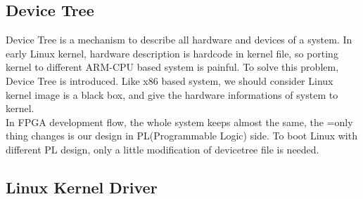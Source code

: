 \subsection{Device Tree}
\label{subsec:Device Tree}

Device Tree is a mechanism to describe all hardware and devices of a system. In early Linux 
kernel, hardware description is hardcode in kernel file, so porting kernel to different
ARM-CPU based system is painful. To solve this problem, Device Tree is introduced. 
Like x86 based system, we should consider Linux kernel image is a black box, and give the 
hardware informations of system to kernel. \\
%
In FPGA development flow, the whole system keeps almost the same, the =only thing changes 
is our design in PL(Programmable Logic) side. To boot Linux with different PL design, only 
a little modification of devicetree file is needed.     


\subsection{Linux Kernel Driver}
\label{subsec:Linux Kernel Driver} 



